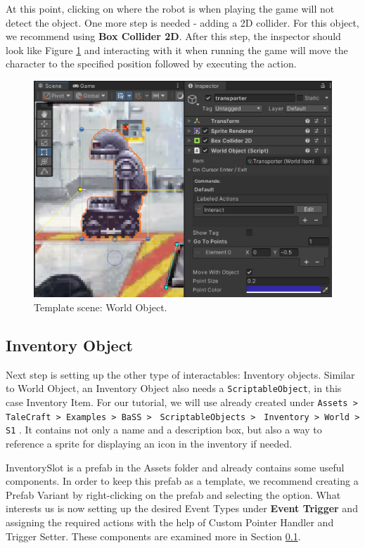 At this point, clicking on where the robot is when playing the game will not detect the object. One more step is needed - adding a 2D collider. For this object, we recommend using \textbf{Box Collider 2D}. After this step, the inspector should look like Figure \ref{fig:Tutorial-template:WO} and interacting with it when running the game will move the character to the specified position followed by executing the action.

\begin{figure}[H]
\centering
\includegraphics[width=0.8\linewidth]{img/User doc/image_2025-07-08_120956206.png}
\caption{Template scene: World Object.}
\label{fig:Tutorial-template:WO}
\end{figure}

\subsection{Inventory Object} 
Next step is setting up the other type of interactables: Inventory objects. Similar to World Object, an Inventory Object also needs a \verb|ScriptableObject|, in this case Inventory Item. For our tutorial, we will use already created under \verb|Assets > TaleCraft > Examples > BaSS > | \verb|ScriptableObjects > | \verb|Inventory > World > S1| . It contains not only a name and a description box, but also a way to reference a sprite for displaying an icon in the inventory if needed.


InventorySlot is a prefab in the Assets folder and already contains some useful components. In order to keep this prefab as a template, we recommend creating a Prefab Variant by right-clicking on the prefab and selecting the option. What interests us is now setting up the desired Event Types under \textbf{Event Trigger} and assigning the required actions with the help of Custom Pointer Handler and Trigger Setter. These components are examined more in Section \ref{}.



